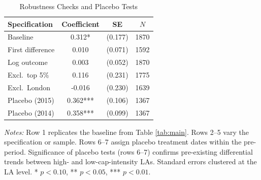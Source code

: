 \begin{table}[t]
\centering
\caption{Robustness Checks and Placebo Tests}
\label{tab:robust}
\begin{tabular}{lccc}
\toprule
Specification & Coefficient & SE & $N$ \\
\midrule
Baseline & 0.312* & (0.177) & 1870 \\
First difference & 0.010 & (0.071) & 1592 \\
Log outcome & 0.003 & (0.052) & 1870 \\
Excl.\ top 5\% & 0.116 & (0.231) & 1775 \\
Excl.\ London & -0.016 & (0.230) & 1639 \\
Placebo (2015) & 0.362*** & (0.106) & 1367 \\
Placebo (2014) & 0.358*** & (0.099) & 1367 \\
\bottomrule
\end{tabular}
\begin{tablenotes}[flushleft]\footnotesize
\item \textit{Notes:} Row 1 replicates the baseline from Table \ref{tab:main}. Rows 2--5 vary the specification or sample. Rows 6--7 assign placebo treatment dates within the pre-period. Significance of placebo tests (rows 6--7) confirms pre-existing differential trends between high- and low-cap-intensity LAs. Standard errors clustered at the LA level. * $p < 0.10$, ** $p < 0.05$, *** $p < 0.01$.
\end{tablenotes}
\end{table}
